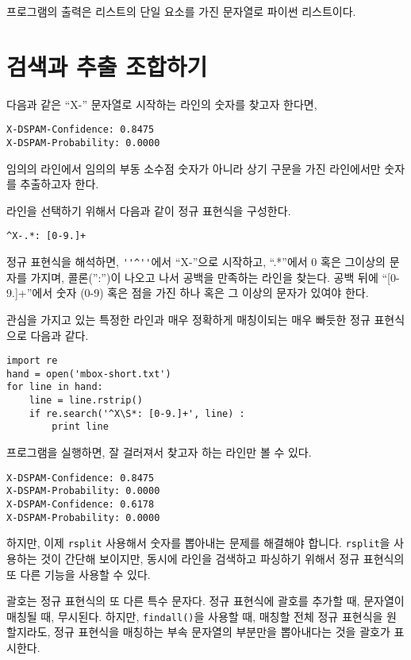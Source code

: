 프로그램의 출력은 리스트의 단일 요소를 가진 문자열로 파이썬 리스트이다.

\section{검색과 추출 조합하기}

다음과 같은 ``X-'' 문자열로 시작하는 라인의 숫자를 찾고자 한다면,

\beforeverb
\begin{verbatim}
X-DSPAM-Confidence: 0.8475
X-DSPAM-Probability: 0.0000  
\end{verbatim}
\afterverb
%

임의의 라인에서 임의의 부동 소수점 숫자가 아니라 상기 구문을 가진 라인에서만 숫자를 추출하고자 한다.

라인을 선택하기 위해서 다음과 같이 정규 표현식을 구성한다.

\beforeverb
\begin{verbatim}
^X-.*: [0-9.]+
\end{verbatim}
\afterverb
%

정규 표현식을 해석하면, {\verb"''^''"}에서 ``X-''으로 시작하고, ``.*''에서 0 혹은 그이상의 문자를 가지며, 콜론('':'')이 나오고 나서 공백을 만족하는 라인을 찾는다.
공백 뒤에 ``[0-9.]+''에서 숫자 (0-9) 혹은 점을 가진 하나 혹은 그 이상의 문자가 있여야 한다.

관심을 가지고 있는 특정한 라인과 매우 정확하게 매칭이되는 매우 빠듯한 정규 표현식으로 다음과 같다.

\beforeverb
\begin{verbatim}
import re
hand = open('mbox-short.txt')
for line in hand:
    line = line.rstrip()
    if re.search('^X\S*: [0-9.]+', line) :
        print line
\end{verbatim}
\afterverb
%

프로그램을 실행하면, 잘 걸러져서 찾고자 하는 라인만 볼 수 있다.

\beforeverb
\begin{verbatim}
X-DSPAM-Confidence: 0.8475
X-DSPAM-Probability: 0.0000
X-DSPAM-Confidence: 0.6178
X-DSPAM-Probability: 0.0000
\end{verbatim}
\afterverb
%

하지만, 이제 {\tt rsplit} 사용해서 숫자를 뽑아내는 문제를 해결해야 합니다.
{\tt rsplit}을 사용하는 것이 간단해 보이지만, 동시에 라인을 검색하고 파싱하기 위해서 정규 표현식의 또 다른 기능을 사용할 수 있다.


괄호는 정규 표현식의 또 다른 특수 문자다. 정규 표현식에 괄호를 추가할 때, 문자열이 매칭될 때, 무시된다.
하지만, {\tt findall()}을 사용할 때, 매칭할 전체 정규 표현식을 원할지라도, 정규 표현식을 매칭하는 부속 문자열의 부분만을 뽑아내다는 것을 괄호가 표시한다.

